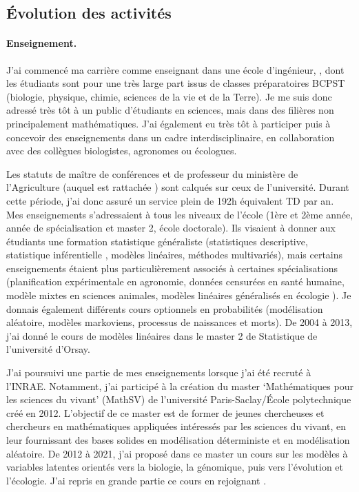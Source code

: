 \subsection*{\'Evolution des activités}

\paragraph{Enseignement.}
J'ai commencé ma carrière comme enseignant dans une école d'ingénieur, \APT, dont les étudiants sont pour une très large part issus de classes préparatoires BCPST (biologie, physique, chimie, sciences de la vie et de la Terre). Je me suis donc adressé très tôt à un public d’étudiants en sciences, mais dans des filières non principalement mathématiques. J’ai également eu très tôt à participer puis à concevoir des enseignements dans un cadre interdisciplinaire, en collaboration avec des collègues biologistes, agronomes ou écologues. 

Les statuts de maître de conférences et de professeur du ministère de l’Agriculture (auquel est rattachée \APT) sont calqués sur ceux de l’université. Durant cette période, j'ai donc assuré un service plein de 192h équivalent TD par an. Mes enseignements s’adressaient à tous les niveaux de l’école (1ère et 2ème année, année de spécialisation et master 2, école doctorale). Ils visaient à donner aux étudiants une formation statistique généraliste (statistiques descriptive, statistique inférentielle \cite{DRV99}, modèles linéaires, méthodes multivariés), mais certains enseignements étaient plus particulièrement associés à certaines spécialisations (planification expérimentale en agronomie, données censurées en santé humaine, modèle mixtes en sciences animales, modèles linéaires généralisés en écologie \cite{DBE15}). Je donnais également différents cours optionnels en probabilités (modélisation aléatoire, modèles markoviens, processus de naissances et morts). De 2004 à 2013, j'ai donné le cours de modèles linéaires dans le master 2 de Statistique de l'université d'Orsay.

\bigskip
J’ai poursuivi une partie de mes enseignements lorsque j’ai été recruté à l’INRAE. Notamment, j'ai participé à la création du master ‘Mathématiques pour les sciences du vivant’ (MathSV) de l’université Paris-Saclay/École polytechnique créé en 2012. L’objectif de ce master est de former de jeunes chercheuses et chercheurs en mathématiques appliquées intéressés par les sciences du vivant, en leur fournissant des bases solides en modélisation déterministe et en modélisation aléatoire. De 2012 à 2021, j’ai proposé dans ce master un cours sur les modèles à variables latentes orientés vers la biologie, la génomique, puis vers l’évolution et l’écologie. J’ai repris en grande partie ce cours en rejoignant \SU.

